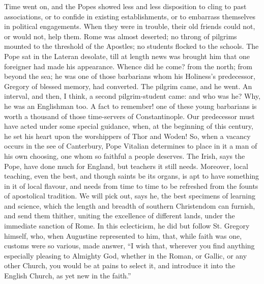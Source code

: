 Time went on, and the Popes showed less and less disposition to
cling to past associations, or to confide in existing establishments,
or to embarrass themselves in political engagements. When they were in
trouble, their old friends could not, or would not, help them. Rome
was almost deserted; no throng of pilgrims mounted to the threshold of
the Apostles; no students flocked to the schools. The Pope sat in the
Lateran desolate, till at length news was brought him that one
foreigner had made his appearance. Whence did he come? from the north;
from beyond the sea; he was one of those barbarians whom his Holiness's
predecessor, Gregory of blessed memory, had converted. The pilgrim
came, and he went. An interval, and then, I think, a second
pilgrim-student came: and who was he? Why, he was an Englishman too. A
fact to remember! one of these young barbarians is worth a thousand of
those time-servers of Constantinople. Our predecessor must have acted
under some special guidance, when, at the beginning of this century,
he set his heart upon the worshippers of Thor and Woden! So, when a
vacancy occurs in the see of Canterbury, Pope Vitalian determines to
place in it a man of his own choosing, one whom so faithful a
people deserves. The Irish, says the Pope, have done much for England,
but teachers it still needs. Moreover, local teaching, even the best,
and though saints be its organs, is apt to have something in it of
local flavour, and needs from time to time to be refreshed from the
founts of apostolical tradition. We will pick out, says he, the best
specimens of learning and science, which the length and breadth of
southern Christendom can furnish, and send them thither, uniting the
excellence of different lands, under the immediate sanction of Rome.
In this eclecticism, he did but follow St. Gregory himself, who, when
Augustine represented to him, that, while faith was one, customs were
so various, made answer, ``I wish that, wherever you find anything
especially pleasing to Almighty God, whether in the Roman, or Gallic,
or any other Church, you would be at pains to select it, and introduce
it into the English Church, as yet new in the faith.''

